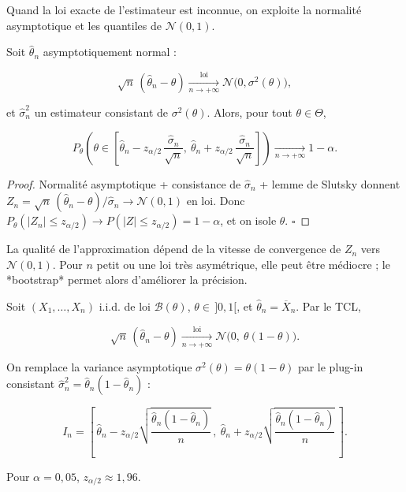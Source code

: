 Quand la loi exacte de l'estimateur est inconnue, on exploite la normalité asymptotique et les quantiles de $\mathcal N(0,1)$.

\medskip

\begin{mdframed}
\begin{proposition}[IC asymptotique] 
Soit $\hat\theta_n$ asymptotiquement normal :

$$
\sqrt n\,(\hat\theta_n - \theta) \xrightarrow[n\to+\infty]{\text{loi}} \mathcal N\big(0,\sigma^2(\theta)\big),
$$

et $\hat\sigma_n^2$ un estimateur consistant de $\sigma^2(\theta)$. Alors, pour tout $\theta \in \Theta$,

$$
P_\theta\!\left(\theta \in \left[\hat\theta_n - z_{\alpha/2}\,\frac{\hat\sigma_n}{\sqrt n},\ \hat\theta_n + z_{\alpha/2}\,\frac{\hat\sigma_n}{\sqrt n}\right]\right) \xrightarrow[n\to+\infty]{} 1-\alpha.
$$
\end{proposition}
\end{mdframed}

\begin{proof}
Normalité asymptotique + consistance de $\hat\sigma_n$ + lemme de Slutsky donnent $Z_n = \sqrt n\,(\hat\theta_n - \theta)/\hat\sigma_n \to \mathcal N(0,1)$ en loi. Donc $P_\theta(|Z_n| \le z_{\alpha/2}) \to P(|Z| \le z_{\alpha/2}) = 1-\alpha$, et on isole $\theta$. $\square$
\end{proof}

\begin{remarque}
La qualité de l'approximation dépend de la vitesse de convergence de $Z_n$ vers $\mathcal N(0,1)$. Pour $n$ petit ou une loi très asymétrique, elle peut être médiocre ; le *bootstrap* permet alors d'améliorer la précision.
\end{remarque}

\begin{exemple}
Soit $(X_1,\dots,X_n)$ i.i.d. de loi $\mathcal B(\theta)$, $\theta \in\, ]0,1[$, et $\hat\theta_n = \overline X_n$. Par le TCL,

$$
\sqrt n\,(\hat\theta_n - \theta) \xrightarrow[n\to+\infty]{\text{loi}} \mathcal N\big(0,\ \theta(1-\theta)\big).
$$

On remplace la variance asymptotique $\sigma^2(\theta) = \theta(1-\theta)$ par le plug-in consistant $\hat\sigma_n^2 = \hat\theta_n(1-\hat\theta_n)$ :

$$
I_n = \left[\,\hat\theta_n - z_{\alpha/2}\sqrt{\frac{\hat\theta_n(1-\hat\theta_n)}{n}}\,,\ \hat\theta_n + z_{\alpha/2}\sqrt{\frac{\hat\theta_n(1-\hat\theta_n)}{n}}\,\right].
$$

Pour $\alpha = 0{,}05$, $z_{\alpha/2} \approx 1{,}96$.
\end{exemple}

